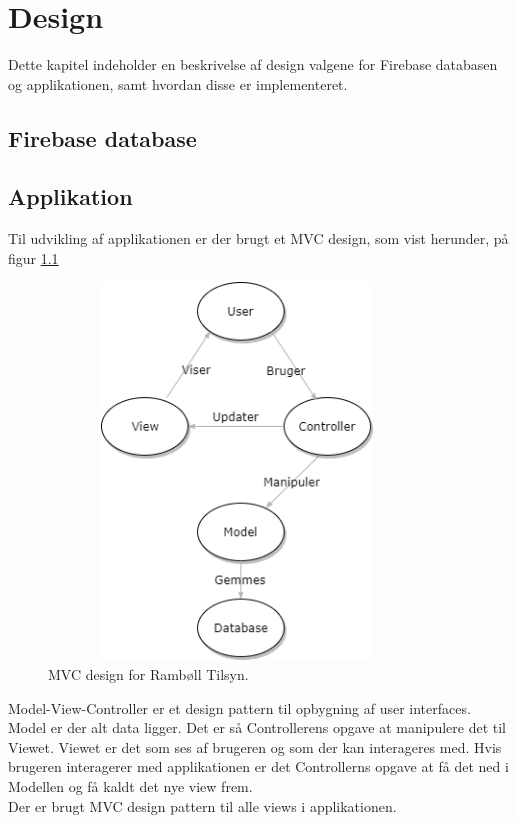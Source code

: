 \chapter{Design}
Dette kapitel indeholder en beskrivelse af design valgene for Firebase databasen og applikationen, samt hvordan disse er implementeret. \\

\section{Firebase database}

\section{Applikation}
Til udvikling af applikationen er der brugt et MVC design, som vist herunder, på figur \ref{fig:MVC}
\begin{figure}[H] %
	\centering
	\includegraphics[height=10cm, width=10cm]{../ArkitekturDesign/Design/MVC}
	\caption{MVC design for Rambøll Tilsyn.}
	\label{fig:MVC}
\end{figure}

Model-View-Controller er et design pattern til opbygning af user interfaces. Model er der alt
data ligger. Det er så Controllerens opgave at manipulere det til Viewet. Viewet er det som
ses af brugeren og som der kan interageres med. Hvis brugeren interagerer med applikationen er
det Controllerns opgave at få det ned i Modellen og få kaldt det nye view frem. \\
Der er brugt MVC design pattern til alle views i applikationen.

